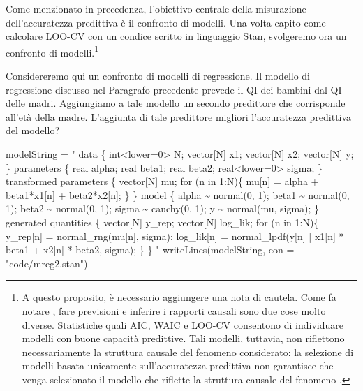 \documentclass[
  10pt,
  italian,
  a4paper,
  extrafontsizes,onecolumn,openright
  ]{memoir}
\newenvironment{Shaded}{\begin{snugshade}}{\end{snugshade}}
\newcommand{\AttributeTok}[1]{\textcolor[rgb]{0.77,0.63,0.00}{#1}}
\newcommand{\FunctionTok}[1]{\textcolor[rgb]{0.00,0.00,0.00}{#1}}
\newcommand{\NormalTok}[1]{#1}
\newcommand{\OtherTok}[1]{\textcolor[rgb]{0.56,0.35,0.01}{#1}}
\newcommand{\StringTok}[1]{\textcolor[rgb]{0.31,0.60,0.02}{#1}}
\theoremstyle{definition}
\theoremstyle{definition}
\theoremstyle{definition}
\theoremstyle{definition}
\theoremstyle{remark}
\begin{document}
Come menzionato in precedenza, l'obiettivo centrale della misurazione dell'accuratezza predittiva è il confronto di modelli. Una volta capito come calcolare LOO-CV con un condice scritto in linguaggio Stan, svolgeremo ora un confronto di modelli.\footnote{A questo proposito, è necessario aggiungere una nota di cautela. Come fa notare \textcite{McElreath_rethinking}, fare previsioni e inferire i rapporti causali sono due cose molto diverse. Statistiche quali AIC, WAIC e LOO-CV consentono di individuare modelli con buone capacità predittive. Tali modelli, tuttavia, non riflettono necessariamente la struttura causale del fenomeno considerato: la selezione di modelli basata unicamente sull'accuratezza predittiva non garantisce che venga selezionato il modello che riflette la struttura causale del fenomeno \autocite[si veda anche][]{navarro2019between}.}

Considereremo qui un confronto di modelli di regressione. Il modello di regressione discusso nel Paragrafo precedente prevede il QI dei bambini dal QI delle madri. Aggiungiamo a tale modello un secondo predittore che corrisponde all'età della madre. L'aggiunta di tale predittore migliori l'accuratezza predittiva del modello?

\begin{Shaded}
\begin{Highlighting}[]
\NormalTok{modelString }\OtherTok{=} \StringTok{"}
\StringTok{data \{}
\StringTok{  int\textless{}lower=0\textgreater{} N;}
\StringTok{  vector[N] x1;}
\StringTok{  vector[N] x2;}
\StringTok{  vector[N] y;}
\StringTok{\}}
\StringTok{parameters \{}
\StringTok{  real alpha;}
\StringTok{  real beta1;}
\StringTok{  real beta2;}
\StringTok{  real\textless{}lower=0\textgreater{} sigma;}
\StringTok{\}}
\StringTok{transformed parameters \{}
\StringTok{  vector[N] mu;}
\StringTok{  for (n in 1:N)\{}
\StringTok{    mu[n] = alpha + beta1*x1[n] + beta2*x2[n];}
\StringTok{  \}}
\StringTok{\}}
\StringTok{model \{}
\StringTok{  alpha \textasciitilde{} normal(0, 1);}
\StringTok{  beta1 \textasciitilde{} normal(0, 1);}
\StringTok{  beta2 \textasciitilde{} normal(0, 1);}
\StringTok{  sigma \textasciitilde{} cauchy(0, 1);}
\StringTok{  y \textasciitilde{} normal(mu, sigma);}
\StringTok{\}}
\StringTok{generated quantities \{}
\StringTok{  vector[N] y\_rep;}
\StringTok{  vector[N] log\_lik;}
\StringTok{  for (n in 1:N)\{}
\StringTok{    y\_rep[n] = normal\_rng(mu[n], sigma);}
\StringTok{    log\_lik[n] = normal\_lpdf(y[n] | x1[n] * beta1 + x2[n] * beta2, sigma);}
\StringTok{  \}}
\StringTok{\}}
\StringTok{"}
\FunctionTok{writeLines}\NormalTok{(modelString, }\AttributeTok{con =} \StringTok{"code/mreg2.stan"}\NormalTok{)}
\end{Highlighting}
\end{Shaded}
\end{document}

